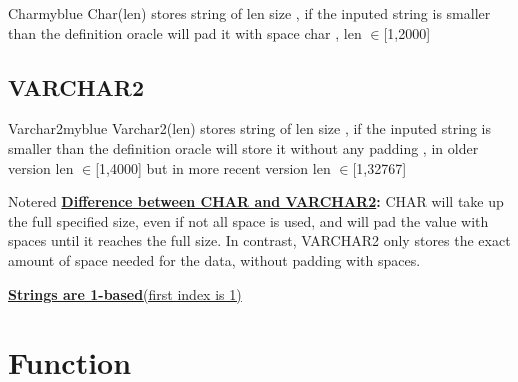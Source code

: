 \begin{prettyBox}{Char}{myblue}
Char(len) stores string of len size , if the inputed string is smaller than the definition
oracle will pad it with space char , len \(\in\)[1,2000]
\end{prettyBox}

\vspace{0.25cm}
\subsection{VARCHAR2}

\begin{prettyBox}{Varchar2}{myblue}
Varchar2(len) stores string of len size , if the inputed string is smaller than the definition
oracle will store it without any padding , in older version len \(\in\)[1,4000] but in more recent
version len \(\in\)[1,32767] 
\end{prettyBox}


\vspace{1cm}
\begin{prettyBox}{Note}{red}
  \textbf{\underline{Difference between CHAR and VARCHAR2}:} CHAR will take up the full specified size, even if not all space is used, and will pad the value with spaces until it reaches the full size. 
In contrast, VARCHAR2 only stores the exact amount of space needed for the data, without padding with spaces.

\vspace{0.25cm}
\underline{\textbf{Strings are 1-based}(first index is 1)}
\end{prettyBox}

\vspace{0.5cm}


\section{Function}

